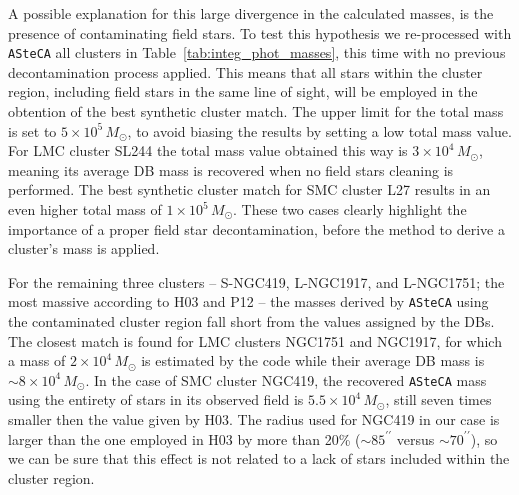 \documentclass{aa}
\begin{document}
A possible explanation for this large divergence in the calculated masses, is
the presence of contaminating field stars.
To test this hypothesis we re-processed with \texttt{ASteCA} all clusters in
Table~\ref{tab:integ_phot_masses}, this time with no previous decontamination
process applied. This means that all stars within the cluster region, including
field stars in the same line of sight, will be employed in the obtention of 
the best synthetic cluster match. The upper limit for the total mass is set to
$5{\times}10^5\,M_{\odot}$, to avoid biasing the results by setting a low total
mass value.
%
For LMC cluster SL244 the total mass value obtained this way is
$3{\times}10^4\,M_{\odot}$, meaning its average DB mass is recovered when no
field stars cleaning is performed.
The best synthetic cluster match for SMC cluster L27 results in an even higher
total mass of $1{\times}10^5\,M_{\odot}$. These two cases clearly highlight the
importance of a proper field star decontamination, before the method to derive a
cluster's mass is applied.

For the remaining three clusters -- S-NGC419, L-NGC1917, and L-NGC1751; the most
massive according to H03 and P12 -- the masses derived by \texttt{ASteCA} using
the contaminated cluster region fall short from the values assigned by the DBs.
The closest match is found for LMC clusters NGC1751 and NGC1917, for which a
mass of $2{\times}10^4\,M_{\odot}$ is estimated by the code while their average DB
mass is ${\sim}8{\times}10^4\,M_{\odot}$.
In the case of SMC cluster NGC419, the recovered \texttt{ASteCA} mass using the
entirety of stars in its observed field is $5.5{\times}10^4\,M_{\odot}$, still
seven times smaller then the value given by H03. The radius used for NGC419 in
our case is larger than the one employed in H03 by more than 20\%
(${\sim}85^{\prime\prime}$ versus ${\sim}70^{\prime\prime}$), so we can be sure
that this effect is not related to a lack of stars included within the cluster
region.
\end{document}
